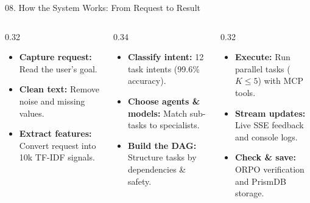\documentclass[aspectratio=169,10pt]{beamer}
\begin{document}
\begin{frame}[t]{08. How the System Works: From Request to Result}
\vspace{-0.30em}
\begin{columns}[T]
\begin{column}{0.32\textwidth}
  \begin{tcolorbox}[
    enhanced, arc=3pt, colframe=lavenderDark, colback=white,
    title={\scriptsize\bfseries Stage 1: Ingestion \& Features},
    boxrule=0.55pt, left=3.5pt, right=3.5pt, top=2.0pt, bottom=2.0pt
  ]
  \fontsize{6.0}{7.2}\selectfont
  \begin{itemize}\setlength{\itemsep}{1.6pt}
    \item \textbf{Capture request:} Read the user's goal.
    \item \textbf{Clean text:} Remove noise and missing values.
    \item \textbf{Extract features:} Convert request into 10k TF-IDF signals.
  \end{itemize}
  \end{tcolorbox}
\end{column}

\begin{column}{0.34\textwidth}
  \begin{tcolorbox}[
    enhanced, arc=3pt, colframe=prismTeal, colback=white,
    title={\scriptsize\bfseries Stage 2: Intelligence \& DAG},
    boxrule=0.55pt, left=3.5pt, right=3.5pt, top=2.0pt, bottom=2.0pt
  ]
  \fontsize{6.0}{7.2}\selectfont
  \begin{itemize}\setlength{\itemsep}{1.6pt}
    \item \textbf{Classify intent:} 12 task intents (99.6\% accuracy).
    \item \textbf{Choose agents \& models:} Match sub-tasks to specialists.
    \item \textbf{Build the DAG:} Structure tasks by dependencies \& safety.
  \end{itemize}
  \end{tcolorbox}
\end{column}

\begin{column}{0.32\textwidth}
  \begin{tcolorbox}[
    enhanced, arc=3pt, colframe=lavenderMedium, colback=white,
    title={\scriptsize\bfseries Stage 3: Execution \& Storage},
    boxrule=0.55pt, left=3.5pt, right=3.5pt, top=2.0pt, bottom=2.0pt
  ]
  \fontsize{6.0}{7.2}\selectfont
  \begin{itemize}\setlength{\itemsep}{1.6pt}
    \item \textbf{Execute:} Run parallel tasks ($K \le 5$) with MCP tools.
    \item \textbf{Stream updates:} Live SSE feedback and console logs.
    \item \textbf{Check \& save:} ORPO verification and PrismDB storage.
  \end{itemize}
  \end{tcolorbox}
\end{column}
\end{columns}


\end{frame}
\end{document}
